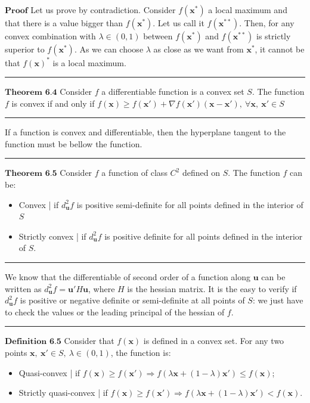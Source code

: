 \documentclass[0pt, a4paper]{article}
\begin{document}
$\textbf{Proof}$ Let us prove by contradiction. Consider $f(\textbf{x}^*)$ a local maximum and that there is a value bigger than $f(\textbf{x}^*)$. Let us call it $f(\textbf{x}^{**})$. Then, for any convex combination with $\lambda\in(0,1)$ between $f(\textbf{x}^*)$ and $f(\textbf{x}^{**})$ is strictly superior to $f(\textbf{x}^{*})$. As we can choose $\lambda$ as close as we want from $\textbf{x}^*$, it cannot be that $f(\textbf{x})^*$ is a local maximum.


\noindent\rule{\textwidth}{1pt}

$\textbf{Theorem 6.4}$ Consider $f$ a differentiable function is a convex set $S$. The function $f$ is convex if and only if $f(\textbf{x})\geq f(\textbf{x}')+\nabla f(\textbf{x}')(\textbf{x}-\textbf{x}'),\ \forall\textbf{x},\ \textbf{x}'\in S$

\noindent\rule{\textwidth}{1pt}

If a function is convex and differentiable, then the hyperplane tangent to the function must be bellow the function.

\noindent\rule{\textwidth}{1pt}

$\textbf{Theorem 6.5}$ Consider $f$ a function of class $C^2$ defined on $S$. The function $f$ can be:
\begin{itemize}
	\item Convex | if $d^2_\textbf{u}f$ is positive semi-definite for all points defined in the interior of $S$
	\item Strictly convex | if $d^2_\textbf{u}f$ is positive definite for all points defined in the interior of $S$.
\end{itemize}

\noindent\rule{\textwidth}{1pt}

We know that the differentiable of second order of a function along $\textbf{u}$ can be written as $d^2_\textbf{u}f = \textbf{u}'H\textbf{u}$, where $H$ is the hessian matrix. It is the easy to verify if $d^2_\textbf{u}f$ is positive or negative definite or semi-definite at all points of $S$: we just have to check the values or the leading principal of the hessian of $f$. 

\noindent\rule{\textwidth}{1pt}

$\textbf{Definition 6.5}$ Consider that $f(\textbf{x})$ is defined in a convex set. For any two points $\textbf{x},\ \textbf{x}'\in S,\ \lambda\in(0,1)$, the function is:
\begin{itemize}
	\item Quasi-convex | if $f(\textbf{x})\geq  f(\textbf{x}')\Rightarrow f(\lambda\textbf{x}+(1-\lambda)\textbf{x}')\leq f(\textbf{x})$;
	\item Strictly quasi-convex | if $f(\textbf{x})\geq f(\textbf{x}')\Rightarrow f(\lambda\textbf{x}+(1-\lambda)\textbf{x}')< f(\textbf{x})$.
\end{itemize}
\end{document}
